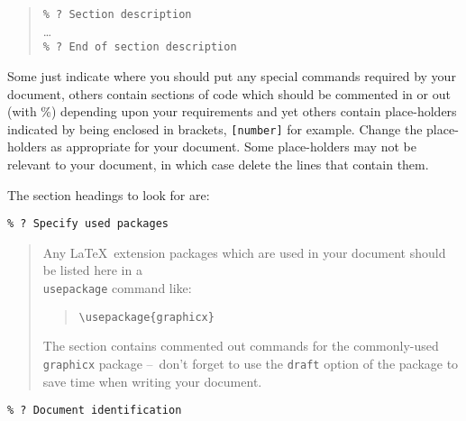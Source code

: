 \documentclass[twoside,11pt]{article}
\renewcommand{\_}{\texttt{\symbol{95}}}
\newcommand{\dash}{--}
\newcommand{\dash}{-}
\begin{document}
\begin{quote}
\verb+% ? Section description+\\
\ldots\\
\verb+% ? End of section description+
\end{quote}

Some just indicate where you should put any special commands required by
your document, others contain sections of code which should be commented
in or out (with \%) depending upon your requirements and yet others contain
place-holders indicated by being enclosed in brackets,
\texttt{[number]} for example.
Change the place-holders as appropriate for your document.
Some place-holders may not be relevant to your document, in which case
delete the lines that contain them.

The section headings to look for are:


\vspace{6mm}

\verb+% ? Specify used packages+

\begin{quote}
Any \LaTeX\ extension packages which are used in your document should
be listed here in a {\tt \\usepackage} command like:
\begin{quote}
\verb+\usepackage{graphicx}+
\end{quote}
The section contains commented out commands for the commonly-used
\verb+graphicx+ package \dash\ don't forget to use the \texttt{draft} option of
the package to save time when writing your document.
\end{quote}

\vspace{6mm}

\verb+% ? Document identification+
\end{document}
